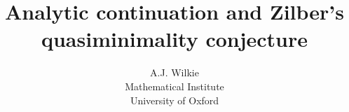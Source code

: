 \documentclass[12pt,nodate]{article}
\date{}
\begin{document}
\newtheorem{theorem}{Theorem}
\newtheorem{lemma}{Lemma}
\newtheorem{proposition}{Proposition}
\newtheorem{definition}{Definition}
\newtheorem{corollary}{Corollary}
\newtheorem{notation}{Notation}

\newcommand{\cF}{\ensuremath{\mathcal{F}}}
\newcommand{\PRF}{\ensuremath{\mathbb{R}(PR(\mathcal{F}))}}
\newcommand{\C}{\ensuremath{\mathbb{C}}}
\newcommand{\Cn}{\ensuremath{\mathbb{C}^{n}}}
\newcommand{\PF}{\ensuremath{PR(\mathcal{F})}}
\newcommand{\wdF}{\ensuremath{\mathbf{w} \in dom(F)}}
\newcommand{\dFi}{\ensuremath{\frac{\partial F}{\partial z_{i}}}}
\newcommand{\bz}{\ensuremath{\mathbf{z}}}
\newcommand{\R}{\ensuremath{\mathbb{R}}}
\newcommand{\dFsn}{\ensuremath{\frac{\partial F}{\partial z_{n+1}}}}
\newcommand{\bw}{\ensuremath{\mathbf{w}}}
\newcommand{\ba}{\ensuremath{\mathbf{a}}}
\newcommand{\cFt}{\ensuremath{\tilde{\mathcal{F}}}}
\newcommand{\awd}{\ensuremath{\langle w_{1} , \ldots , w_{n} \rangle}}
\newcommand{\idFsn}{\ensuremath{\frac{\partial^{i}F}{\partial z_{n+1}^{i}}}} 
\newcommand{\pidFsn}{\ensuremath{\frac{\partial^{i-1}F}
{\partial z_{n+1}^{i-1}}}}
\newcommand{\dHssn}{\ensuremath{\frac{\partial H}{\partial z_{n+2}}}}
\newcommand{\tF}{\ensuremath{\tilde{\mathcal{F}}}}
\newcommand{\dfi}{\ensuremath{\frac{\partial f}{\partial z_{i}}}}
\newcommand{\dGij}{\ensuremath{\frac{\partial G_{i}}{\partial z_{j}}}}
\newcommand{\tD}{\ensuremath{\tilde{D}}}
\newcommand{\lm}{\ensuremath{[\lambda : \mu ]}}
\newcommand{\bx}{\ensuremath{\mathbf{x}}}
\newcommand{\by}{\ensuremath{\mathbf{y}}}
\newcommand{\mx}{\ensuremath{\mu(x)}}
\newcommand{\lx}{\ensuremath{\lambda(x)}}
\newcommand{\ly}{\ensuremath{\lambda(y)}}
\newcommand{\si}{\ensuremath{\sqrt{-1}}}
\newcommand{\my}{\ensuremath{\mu(y)}}
\newcommand{\bxy}{\ensuremath{(\mathbf{x}, \mathbf{y})}}
\newcommand{\abxy}{\ensuremath{\langle \mathbf{x}, \mathbf{y} \rangle}}
\newcommand{\pbxy}{\ensuremath{\mathbf{x} + \sqrt{-1} \mathbf{y}}}
\newcommand{\duxi}{\ensuremath{\frac{\partial u}{\partial x_{i}}}}
\newcommand{\duyi}{\ensuremath{\frac{\partial u}{\partial y_{i}}}}
\newcommand{\mxi}{\ensuremath{\mu(x_i )}}
\newcommand{\myi}{\ensuremath{\mu(y_i )}}
\newcommand{\lxi}{\ensuremath{\lambda(x_i)}}
\newcommand{\lyi}{\ensuremath{\lambda(y_i)}}
\newcommand{\cE}{\ensuremath{\mathcal{E}}}
\newcommand{\Rn}{\ensuremath{\mathbb{R}^{n}}}


\title{Analytic continuation and Zilber's quasiminimality conjecture}
      
\author{A.J. Wilkie\\
    Mathematical Institute\\
    University of Oxford\\}
\end{document}
